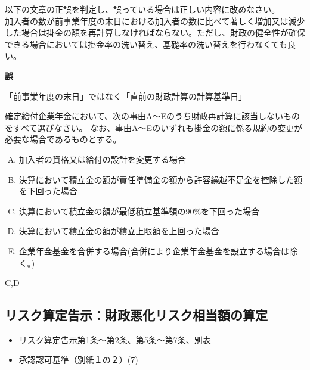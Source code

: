 \begin{truefalse}[年金2 2025 問題1(1)ア\ajRoman{4}]
以下の文章の正誤を判定し、誤っている場合は正しい内容に改めなさい。
\\

  加入者の数が前事業年度の末日における加入者の数に比べて著しく増加又は減少
  した場合は掛金の額を再計算しなければならない。ただし、財政の健全性が確保
  できる場合においては掛金率の洗い替え、基礎率の洗い替えを行わなくても良い。
\end{truefalse}

\begin{answerbox}
  \textbf{誤}

  「前事業年度の末日」ではなく「直前の財政計算の計算基準日」
\end{answerbox}

\begin{truefalse}[数理人試験 H15 問題1(5)]
  確定給付企業年金において、次の事由A〜Eのうち財政再計算に該当しないものをすべて選びなさい。
  なお、事由A〜Eのいずれも掛金の額に係る規約の変更が必要な場合であるものとする。

  \begin{enumerate}[A. ]
    \item 加入者の資格又は給付の設計を変更する場合
    \item 決算において積立金の額が責任準備金の額から許容繰越不足金を控除した額を下回った場合
    \item 決算において積立金の額が最低積立基準額の90\%を下回った場合
    \item 決算において積立金の額が積立上限額を上回った場合
    \item 企業年金基金を合併する場合(合併により企業年金基金を設立する場合は除く。)
  \end{enumerate}

\end{truefalse}

\begin{answerbox}
  C,D
\end{answerbox}

\newpage

\subsection{リスク算定告示：財政悪化リスク相当額の算定}

\begin{InyouJobunbox}
  \begin{itemize}
    \item リスク算定告示第1条〜第2条、第5条〜第7条、別表
    \item 承認認可基準（別紙１の２）(7)
  \end{itemize}
\end{InyouJobunbox}

